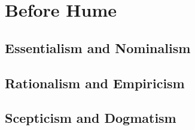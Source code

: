 \def\rbjidbefore{$$Id: before.tex,v 1.3 2009/10/12 11:22:44 rbj Exp $$}
\section{Before Hume}\label{Before}

\subsection{Essentialism and Nominalism}

\subsection{Rationalism and Empiricism}

\subsection{Scepticism and Dogmatism}
